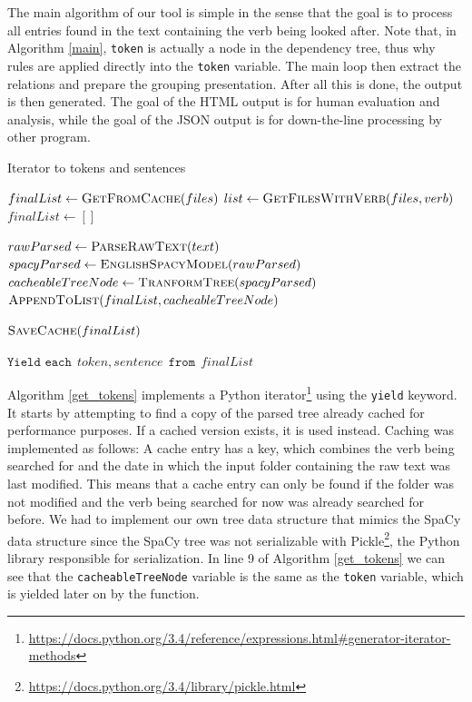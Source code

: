 \documentclass[11pt,a4paper,openright]{memoir}
\begin{document}
The main algorithm of our tool is simple in the sense that the goal is to process all entries found in the text containing the verb being looked after. Note that, in Algorithm \ref{main}, \texttt{token} is actually a node in the dependency tree, thus why rules are applied directly into the \texttt{token} variable. The main loop then extract the relations and prepare the grouping presentation. After all this is done, the output is then generated. The goal of the HTML output is for human evaluation and analysis, while the goal of the JSON output is for down-the-line processing by other program.

\begin{algorithm}[t]
  \caption{Iterator to tokens and sentences}\label{get_tokens}
  \begin{algorithmic}[1]
  
    		\State $finalList\gets \Call{GetFromCache}{files}$
       		\State $list\gets \Call{GetFilesWithVerb}{files, verb}$
       		\State $finalList\gets []$
    		
             \State $rawParsed\gets \Call{ParseRawText}{text}$
             \State $spacyParsed\gets \Call{EnglishSpacyModel}{rawParsed}$
             \State $cacheableTreeNode\gets \Call{TranformTree}{spacyParsed}$
             \State $\Call{AppendToList}{finalList, cacheableTreeNode}$
           \EndFor
        
       		\State $\Call{SaveCache}{finalList}$
    		\EndIf
    		
    \State $\texttt{Yield  each} \ \ token, sentence \ \ \texttt{from} \ \ finalList$

    \EndProcedure
    
  \end{algorithmic}
\end{algorithm}

Algorithm \ref{get_tokens} implements a Python iterator\footnote{\url{https://docs.python.org/3.4/reference/expressions.html\#generator-iterator-methods}} using the \texttt{yield} keyword. It starts by attempting to find a copy of the parsed tree already cached for performance purposes. If a cached version exists, it is used instead. Caching was implemented as follows: A cache entry has a key, which combines the verb being searched for and the date in which the input folder containing the raw text was last modified. This means that a cache entry can only be found if the folder was not modified and the verb being searched for now was already searched for before. We had to implement our own tree data structure that mimics the SpaCy data structure since the SpaCy tree was not serializable with Pickle\footnote{\url{https://docs.python.org/3.4/library/pickle.html}}, the Python library responsible for serialization. In line 9 of Algorithm \ref{get_tokens} we can see that the \texttt{cacheableTreeNode} variable is the same as the \texttt{token} variable, which is yielded later on by the function.
\end{document}
